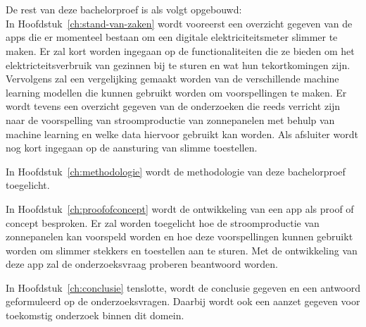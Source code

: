 \section{}%
\label{sec:opzet-bachelorproef}


De rest van deze bachelorproef is als volgt opgebouwd: \\

In Hoofdstuk~\ref{ch:stand-van-zaken} wordt vooreerst een overzicht gegeven van de apps die er momenteel bestaan om een digitale elektriciteitsmeter slimmer te maken. Er zal kort worden ingegaan op de functionaliteiten die ze bieden om het elektricteitsverbruik van gezinnen bij te sturen en wat hun tekortkomingen zijn. Vervolgens zal een vergelijking gemaakt worden van de verschillende machine learning modellen die kunnen gebruikt worden om voorspellingen te maken. Er wordt tevens een overzicht gegeven van de onderzoeken die reeds verricht zijn naar de voorspelling van stroomproductie van zonnepanelen met behulp van machine learning en welke data hiervoor gebruikt kan worden. Als afsluiter wordt nog kort ingegaan op de aansturing van slimme toestellen.

In Hoofdstuk~\ref{ch:methodologie} wordt de methodologie van deze bachelorproef toegelicht.

In Hoofdstuk~\ref{ch:proofofconcept} wordt de ontwikkeling van een app als proof of concept besproken. Er zal worden toegelicht hoe de stroomproductie van zonnepanelen kan voorspeld worden en hoe deze voorspellingen kunnen gebruikt worden om slimmer stekkers en toestellen aan te sturen. Met de ontwikkeling van deze app zal de onderzoeksvraag proberen beantwoord worden.

In Hoofdstuk~\ref{ch:conclusie} tenslotte, wordt de conclusie gegeven en een antwoord geformuleerd op de onderzoeksvragen. Daarbij wordt ook een aanzet gegeven voor toekomstig onderzoek binnen dit domein.
